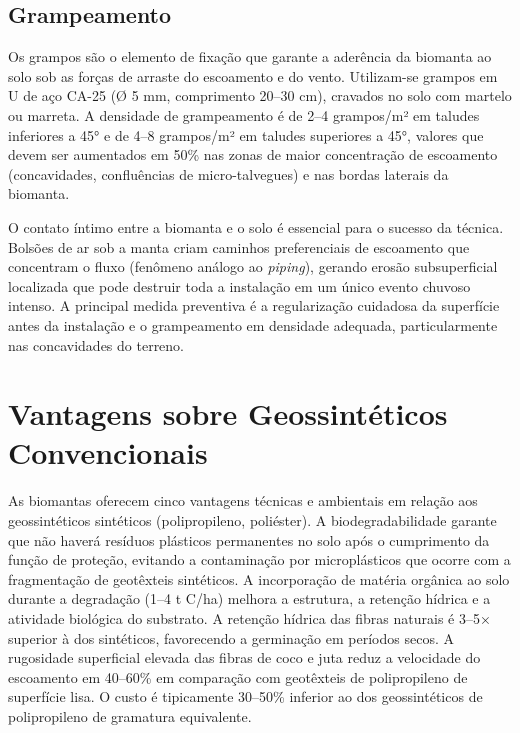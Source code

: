 \documentclass[
  portuguese,
  11pt,
  a4paper,
  open=any]{scrbook}
\begin{document}
\subsection{Grampeamento}\label{grampeamento}

Os grampos são o elemento de fixação que garante a aderência da biomanta
ao solo sob as forças de arraste do escoamento e do vento. Utilizam-se
grampos em U de aço CA-25 (Ø 5 mm, comprimento 20--30 cm), cravados no
solo com martelo ou marreta. A densidade de grampeamento é de 2--4
grampos/m² em taludes inferiores a 45° e de 4--8 grampos/m² em taludes
superiores a 45°, valores que devem ser aumentados em 50\% nas zonas de
maior concentração de escoamento (concavidades, confluências de
micro-talvegues) e nas bordas laterais da biomanta.

\begin{tcolorbox}[enhanced jigsaw, leftrule=.75mm, colframe=quarto-callout-important-color-frame, colback=white, bottomrule=.15mm, opacityback=0, colbacktitle=quarto-callout-important-color!10!white, breakable, bottomtitle=1mm, opacitybacktitle=0.6, title=\textcolor{quarto-callout-important-color}{\faExclamation}\hspace{0.5em}{Ponto crítico}, titlerule=0mm, toprule=.15mm, toptitle=1mm, rightrule=.15mm, left=2mm, arc=.35mm, coltitle=black]

O contato íntimo entre a biomanta e o solo é essencial para o sucesso da
técnica. Bolsões de ar sob a manta criam caminhos preferenciais de
escoamento que concentram o fluxo (fenômeno análogo ao \emph{piping}),
gerando erosão subsuperficial localizada que pode destruir toda a
instalação em um único evento chuvoso intenso. A principal medida
preventiva é a regularização cuidadosa da superfície antes da instalação
e o grampeamento em densidade adequada, particularmente nas concavidades
do terreno.

\end{tcolorbox}

\section{Vantagens sobre Geossintéticos
Convencionais}\label{vantagens-sobre-geossintuxe9ticos-convencionais}

As biomantas oferecem cinco vantagens técnicas e ambientais em relação
aos geossintéticos sintéticos (polipropileno, poliéster). A
biodegradabilidade garante que não haverá resíduos plásticos permanentes
no solo após o cumprimento da função de proteção, evitando a
contaminação por microplásticos que ocorre com a fragmentação de
geotêxteis sintéticos. A incorporação de matéria orgânica ao solo
durante a degradação (1--4 t C/ha) melhora a estrutura, a retenção
hídrica e a atividade biológica do substrato. A retenção hídrica das
fibras naturais é 3--5× superior à dos sintéticos, favorecendo a
germinação em períodos secos. A rugosidade superficial elevada das
fibras de coco e juta reduz a velocidade do escoamento em 40--60\% em
comparação com geotêxteis de polipropileno de superfície lisa. O custo é
tipicamente 30--50\% inferior ao dos geossintéticos de polipropileno de
gramatura equivalente.
\end{document}
